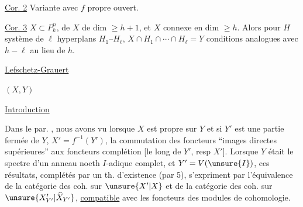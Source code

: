 \uline{Cor. 2} Variante avec $f$ propre
 ouvert.

\uline{Cor. 3} $X\subset P^n_k$, 
de $X$ de dim $\geq h+1$, et $X$ connexe
en dim $\geq h$. Alors pour $H$ système
de $\ell$ hyperplans $H_1$--$H_\ell$,  
$X\cap H_1\cap\cdots\cap H_\ell=Y$
 conditions analogues avec
$h-\ell$ au lieu de $h$.



\begin{flushright}
\uline{Lefschetz-Grauert}

$(X,Y)$
\end{flushright}


\uline{}

\uline{Introduction}

Dans le par. , nous avons vu  lorsque
$X$ est propre sur $Y$ 
 et si $Y'$ est une partie
fermée de $Y$, $X'=f^{-1}(Y')$, la 
commutation des foncteurs 
``images directes supérieures'' aux foncteurs complétion
[le long de $Y'$, resp $X'$].
Lorsque $Y$ était le spectre d'un anneau 
noeth $I$-adique complet, et $Y'=V(\unsure{I})$, ces résultats,
complétés par un th. d'existence (par 5), s'expriment
 
par l'équivalence de la catégorie des 
 coh. sur $\unsure{X'|X}$ et de la catégorie
des  coh. sur $\unsure{X'_{Y'}|\widehat X_{Y'}}$,
\uline{compatible} avec les foncteurs des modules de cohomologie.

